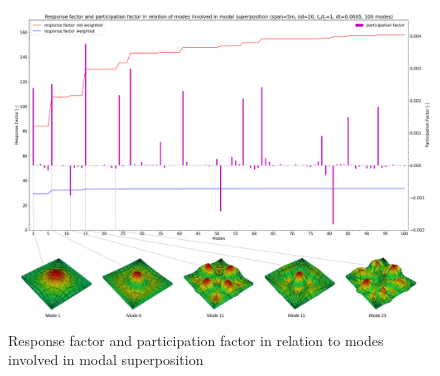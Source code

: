 \begin{figure}[H]
\centering
\includegraphics[width=1\textwidth]{images/res_part_factor.pdf}
\caption{Response factor and participation factor in relation to modes involved in modal superposition}
\label{fig:res_part_factor}
\end{figure}

